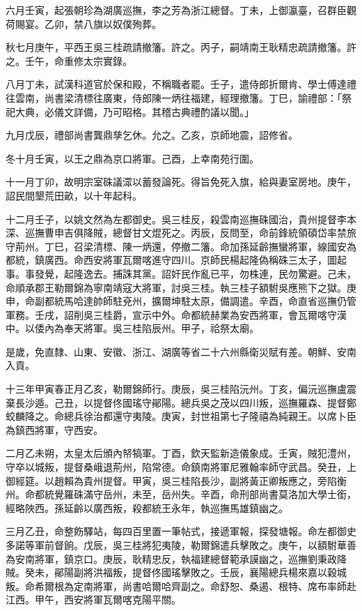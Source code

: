 \begin{pinyinscope}
六月壬寅，起張朝珍為湖廣巡撫，李之芳為浙江總督。丁未，上御瀛臺，召群臣觀荷賜宴。乙卯，禁八旗以奴僕殉葬。

秋七月庚午，平西王吳三桂疏請撤籓。許之。丙子，嗣靖南王耿精忠疏請撤籓。許之。壬午，命重修太宗實錄。

八月丁未，試漢科道官於保和殿，不稱職者罷。壬子，遣侍郎折爾肯、學士傅達禮往雲南，尚書梁清標往廣東，侍郎陳一炳往福建，經理撤籓。丁巳，諭禮部：「祭祀大典，必儀文詳備，乃可昭格。其稽古典禮酌議以聞。」

九月戊辰，禮部尚書龔鼎孳乞休。允之。乙亥，京師地震，詔修省。

冬十月壬寅，以王之鼎為京口將軍。己酉，上幸南苑行圍。

十一月丁卯，故明宗室硃議潀以蓄發論死。得旨免死入旗，給與妻室房地。庚午，詔民間墾荒田畝，以十年起科。

十二月壬子，以姚文然為左都御史。吳三桂反，殺雲南巡撫硃國治，貴州提督李本深、巡撫曹申吉俱降賊，總督甘文焜死之。丙辰，反問至，命前鋒統領碩岱率禁旅守荊州。丁巳，召梁清標、陳一炳還，停撤二籓。命加孫延齡撫蠻將軍，線國安為都統，鎮廣西。命西安將軍瓦爾喀進守四川。京師民楊起隆偽稱硃三太子，圖起事。事發覺，起隆逸去。捕誅其黨。詔奸民作亂已平，勿株連，民勿驚避。己未，命順承郡王勒爾錦為寧南靖寇大將軍，討吳三桂。執三桂子額駙吳應熊下之獄。庚申，命副都統馬哈達帥師駐兗州，擴爾坤駐太原，備調遣。辛酉，命直省巡撫仍管軍務。壬戌，詔削吳三桂爵，宣示中外。命都統赫業為安西將軍，會瓦爾喀守漢中。以倭內為奉天將軍。吳三桂陷辰州。甲子，祫祭太廟。

是歲，免直隸、山東、安徽、浙江、湖廣等省二十六州縣衛災賦有差。朝鮮、安南入貢。

十三年甲寅春正月乙亥，勒爾錦師行。庚辰，吳三桂陷沅州。丁亥，偏沅巡撫盧震棄長沙遁。己丑，以提督佟國瑤守鄖陽。總兵吳之茂以四川叛，巡撫羅森、提督鄭蛟麟降之。命總兵徐治都還守夷陵。庚寅，封世祖第七子隆禧為純親王。以席卜臣為鎮西將軍，守西安。

二月乙未朔，太皇太后頒內帑犒軍。丁酉，欽天監新造儀象成。壬寅，賊犯澧州，守卒以城叛，提督桑峨退荊州，陷常德。命鎮南將軍尼雅翰率師守武昌。癸丑，上御經筵。以趙賴為貴州提督。甲寅，吳三桂陷長沙，副將黃正卿叛應之，旁陷衡州。命都統覺羅硃滿守岳州，未至，岳州失。辛酉，命刑部尚書莫洛加大學士銜，經略陜西。孫延齡以廣西叛，殺都統王永年，執巡撫馬雄鎮幽之。

三月乙丑，命整飭驛站，每四百里置一筆帖式，接遞軍報，探發塘報。命左都御史多諾等軍前督餉。戊辰，吳三桂將犯夷陵，勒爾錦遣兵擊敗之。庚午，以額駙華善為安南將軍，鎮京口。庚辰，耿精忠反，執福建總督範承謨幽之，巡撫劉秉政降賊。癸未，鄖陽副將洪福叛，提督佟國瑤擊敗之。壬辰，襄陽總兵楊來嘉以穀城叛。命希爾根為定南將軍，尚書哈爾哈齊副之。命舒恕、桑遏、根特、席布率師赴江西。甲午，西安將軍瓦爾喀克陽平關。


\end{pinyinscope}

